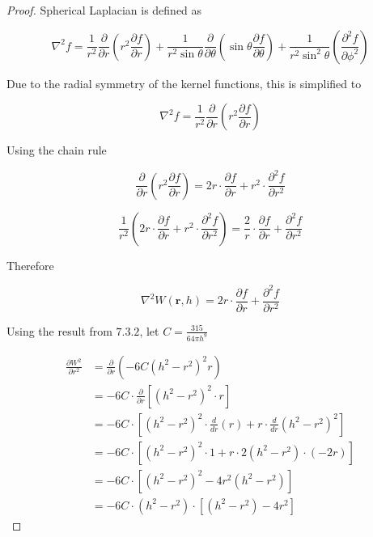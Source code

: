 \documentclass[12pt]{article}
\begin{document}
    \begin{proof}
        Spherical Laplacian is defined as

        $$\nabla^2 f = \frac{1}{r^2}\frac{\partial}{\partial{r}}\left(r^2\frac{\partial{f}}{\partial{r}}\right) + \frac{1}{r^2\sin\theta}\frac{\partial}{\partial{\theta}}\left(\sin\theta\frac{\partial{f}}{\partial{\theta}}\right) + \frac{1}{r^2\sin^2\theta}\left(\frac{\partial^2{f}}{\partial{\phi^2}}\right)$$

        Due to the radial symmetry of the kernel functions, this is simplified to

        $$\nabla^2 f = \frac{1}{r^2}\frac{\partial}{\partial{r}}\left(r^2\frac{\partial{f}}{\partial{r}}\right)$$
        
        Using the chain rule

        $$\frac{\partial}{\partial{r}}\left(r^2\frac{\partial{f}}{\partial{r}}\right) = 2r \cdot \frac{\partial{f}}{\partial{r}} + r^2 \cdot \frac{\partial^2{f}}{\partial{r^2}}$$

        $$\frac{1}{r^2} \left(2r \cdot \frac{\partial{f}}{\partial{r}} + r^2 \cdot \frac{\partial^2{f}}{\partial{r^2}}\right) = \frac{2}{r} \cdot \frac{\partial{f}}{\partial{r}} + \frac{\partial^2{f}}{\partial{r^2}}$$

        Therefore

        $$\nabla^2 W(\textbf{r}, h) = {2}{r} \cdot \frac{\partial{f}}{\partial{r}} + \frac{\partial^2{f}}{\partial{r^2}}$$

        Using the result from $7.3.2$, let $C = \frac{315}{64\pi{h}^9}$

        \begin{align*}
            \frac{\partial W^2}{\partial r^2} 
            &= \frac{\partial}{\partial r} \left(-6C(h^2 - r^2)^2 r\right) \\
            &= -6C \cdot \frac{\partial}{\partial r} \left[(h^2 - r^2)^2 \cdot r\right] \\
            &= -6C \cdot \left[(h^2 - r^2)^2 \cdot \frac{d}{dr}(r) + r \cdot \frac{d}{dr}(h^2 - r^2)^2\right] \\
            &= -6C \cdot \left[(h^2 - r^2)^2 \cdot 1 + r \cdot 2(h^2 - r^2) \cdot (-2r)\right] \\
            &= -6C \cdot \left[(h^2 - r^2)^2 - 4r^2(h^2 - r^2)\right] \\
            &= -6C \cdot (h^2 - r^2) \cdot \left[(h^2 - r^2) - 4r^2\right]
        \end{align*}


\end{proof}
\end{document}

